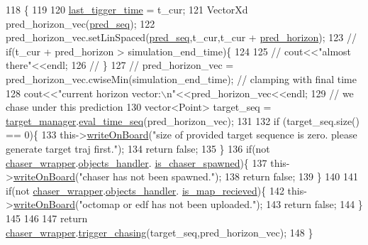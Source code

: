 \begin{DoxyCode}
118                                \{
119 
120     \hyperlink{class_q_node_a932e8eb11684f38ae2fb3f23639b7c70}{last\_tigger\_time} = t\_cur;
121     VectorXd pred\_horizon\_vec(\hyperlink{class_q_node_aed4571afa880dc86a88b229c6517bfa1}{pred\_seq});
122     pred\_horizon\_vec.setLinSpaced(\hyperlink{class_q_node_aed4571afa880dc86a88b229c6517bfa1}{pred\_seq},t\_cur,t\_cur + \hyperlink{class_q_node_a3430f5db8c773c840b76794c82a9d58f}{pred\_horizon}); 
123     \textcolor{comment}{// if(t\_cur + pred\_horizon > simulation\_end\_time)\{}
124 
125     \textcolor{comment}{//     cout<<"almost there"<<endl;}
126     \textcolor{comment}{// \}}
127     \textcolor{comment}{// pred\_horizon\_vec = pred\_horizon\_vec.cwiseMin(simulation\_end\_time); // clamping with final time}
128     cout<<\textcolor{stringliteral}{"current horizon vector:\(\backslash\)n"}<<pred\_horizon\_vec<<endl; 
129     \textcolor{comment}{// we chase under this prediction }
130     vector<Point> target\_seq = \hyperlink{class_q_node_adc66765125dfd755d5e7f0c0eb6e6395}{target\_manager}.\hyperlink{class_target_manager_a63bbc724844890316a654380d0354e93}{eval\_time\_seq}(pred\_horizon\_vec);
131     
132     \textcolor{keywordflow}{if} (target\_seq.size() == 0)\{
133         this->\hyperlink{class_q_node_a80d139522a1333db2c6ea33914c32378}{writeOnBoard}(\textcolor{stringliteral}{"size of provided target sequence is zero. please generate target
       traj first."});
134         \textcolor{keywordflow}{return} \textcolor{keyword}{false};
135     \}
136     \textcolor{keywordflow}{if}(not \hyperlink{class_q_node_ad2d828488fb632a008c7d3ee0e1d1fa2}{chaser\_wrapper}.\hyperlink{class_wrapper_a8cddd5ffbaeb5ab0b5d8d8d0c74f810f}{objects\_handler}.
      \hyperlink{class_objects_handler_a16165ae7c0167ba8d2a0151a8a4fbfd5}{is\_chaser\_spawned})\{
137         this->\hyperlink{class_q_node_a80d139522a1333db2c6ea33914c32378}{writeOnBoard}(\textcolor{stringliteral}{"chaser has not been spawned."});
138         \textcolor{keywordflow}{return} \textcolor{keyword}{false};
139     \}
140 
141     \textcolor{keywordflow}{if}(not \hyperlink{class_q_node_ad2d828488fb632a008c7d3ee0e1d1fa2}{chaser\_wrapper}.\hyperlink{class_wrapper_a8cddd5ffbaeb5ab0b5d8d8d0c74f810f}{objects\_handler}.
      \hyperlink{class_objects_handler_acf1ef1b318defc2a39d87cea72689478}{is\_map\_recieved})\{
142         this->\hyperlink{class_q_node_a80d139522a1333db2c6ea33914c32378}{writeOnBoard}(\textcolor{stringliteral}{"octomap or edf has not been uploaded."});
143         \textcolor{keywordflow}{return} \textcolor{keyword}{false};
144     \}    
145 
146 
147     \textcolor{keywordflow}{return} \hyperlink{class_q_node_ad2d828488fb632a008c7d3ee0e1d1fa2}{chaser\_wrapper}.\hyperlink{class_wrapper_a21a0e115ea80e053e4f2defd1362b92f}{trigger\_chasing}(target\_seq,pred\_horizon\_vec); 
148 \}\end{DoxyCode}
